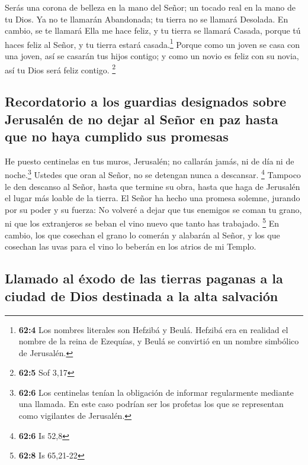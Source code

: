  Serás una corona de belleza en la mano del Señor; un
tocado real en la mano de tu Dios.  Ya no te llamarán
Abandonada; tu tierra no se llamará Desolada. En cambio, se te llamará
Ella me hace feliz, y tu tierra se llamará Casada, porque tú haces feliz
al Señor, y tu tierra estará casada.\footnote{\textbf{62:4} Los nombres
  literales son Hefzibá y Beulá. Hefzibá era en realidad el nombre de la
  reina de Ezequías, y Beulá se convirtió en un nombre simbólico de
  Jerusalén.}  Porque como un joven se casa con una joven,
así se casarán tus hijos contigo; y como un novio es feliz con su novia,
así tu Dios será feliz contigo. \footnote{\textbf{62:5} Sof 3,17}

\hypertarget{recordatorio-a-los-guardias-designados-sobre-jerusaluxe9n-de-no-dejar-al-seuxf1or-en-paz-hasta-que-no-haya-cumplido-sus-promesas}{%
\subsection{Recordatorio a los guardias designados sobre Jerusalén de no
dejar al Señor en paz hasta que no haya cumplido sus
promesas}\label{recordatorio-a-los-guardias-designados-sobre-jerusaluxe9n-de-no-dejar-al-seuxf1or-en-paz-hasta-que-no-haya-cumplido-sus-promesas}}

 He puesto centinelas en tus muros, Jerusalén; no callarán
jamás, ni de día ni de noche.\footnote{\textbf{62:6} Los centinelas
  tenían la obligación de informar regularmente mediante una llamada. En
  este caso podrían ser los profetas los que se representan como
  vigilantes de Jerusalén.} Ustedes que oran al Señor, no se detengan
nunca a descansar. \footnote{\textbf{62:6} Is 52,8} 
Tampoco le den descanso al Señor, hasta que termine su obra, hasta que
haga de Jerusalén el lugar más loable de la tierra.  El
Señor ha hecho una promesa solemne, jurando por su poder y su fuerza: No
volveré a dejar que tus enemigos se coman tu grano, ni que los
extranjeros se beban el vino nuevo que tanto has trabajado. \footnote{\textbf{62:8}
  Is 65,21-22}  En cambio, los que cosechan el grano lo
comerán y alabarán al Señor, y los que cosechan las uvas para el vino lo
beberán en los atrios de mi Templo.

\hypertarget{llamado-al-uxe9xodo-de-las-tierras-paganas-a-la-ciudad-de-dios-destinada-a-la-alta-salvaciuxf3n}{%
\subsection{Llamado al éxodo de las tierras paganas a la ciudad de Dios
destinada a la alta
salvación}\label{llamado-al-uxe9xodo-de-las-tierras-paganas-a-la-ciudad-de-dios-destinada-a-la-alta-salvaciuxf3n}}

